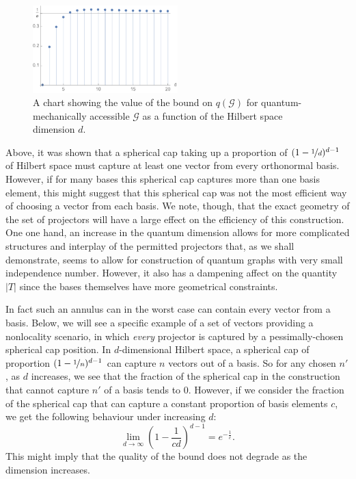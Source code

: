 \documentclass{amsart}
\theoremstyle{definition}
\begin{document}
\begin{figure}
\begin{center}
\includegraphics[width=0.5\textwidth]{boundgraph}
\caption{A chart showing the value of the bound on $q(\mathcal{G})$ for quantum-mechanically accessible $\mathcal{G}$ as a function of the Hilbert space dimension $d$.}
\label{boundgraph}
\end{center}
\end{figure}
Above, it was shown that a spherical cap taking up a proportion of $(1-\nicefrac1d)^{d-1}$ of Hilbert space must capture at least one vector from every orthonormal basis. However, if for many bases this spherical cap captures more than one basis element, this might suggest that this spherical cap was not the most efficient way of choosing a vector from each basis. We note, though, that the exact geometry of the set of projectors will have a large effect on the efficiency of this construction. One one hand, an increase in the quantum dimension allows for more complicated structures and interplay of the permitted projectors that, as we shall demonstrate, seems to allow for construction of quantum graphs with very small independence number. However, it also has a dampening affect on the quantity $|T|$ since the bases themselves have more geometrical constraints. %

In fact such an annulus can in the worst case can contain every vector from a basis. Below, we will see a specific example of a set of vectors providing a nonlocality scenario, in which \emph{every} projector is captured by a pessimally-chosen spherical cap position. In $d$-dimensional Hilbert space, a spherical cap of proportion $(1-\nicefrac1n)^{d-1}$ can capture $n$ vectors out of a basis. So for any chosen $n'$, as $d$ increases, we see that the fraction of the spherical cap in the construction that cannot capture $n'$ of a basis tends to 0. However, if we consider the fraction of the spherical cap that can capture a constant proportion of basis elements $c$, we get the following behaviour under increasing $d$:
\begin{equation}
\lim_{d\rightarrow\infty} \left(1-\frac{1}{cd}\right)^{d-1}=e^{-\frac1c}.
\end{equation}
This might imply that the quality of the bound does not degrade as the dimension increases.%
\end{document}
